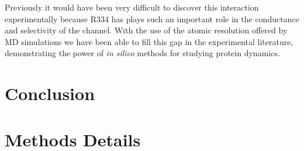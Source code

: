 Previously it would have been very difficult to discover this interaction experimentally because R334 has plays such an important role in the conductance and selectivity of the channel. With the use of the atomic resolution offered by MD simulations we have been able to fill this gap in the experimental literature, demonstrating the power of \textit {in silico} methods for studying protein dynamics.

\section{Conclusion}

\section{Methods Details}
